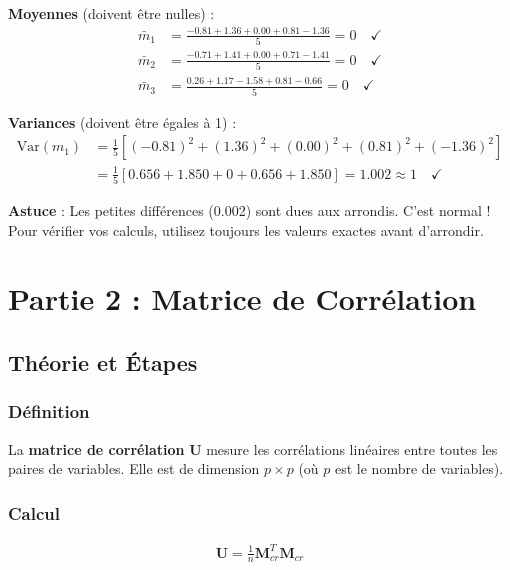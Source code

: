 \documentclass[11pt,a4paper]{article}
\newcommand{\Var}{\text{Var}}
\begin{document}
\textbf{Moyennes} (doivent être nulles) :
\begin{align*}
\bar{m}_1 &= \frac{-0.81 + 1.36 + 0.00 + 0.81 - 1.36}{5} = 0 \quad \checkmark \\
\bar{m}_2 &= \frac{-0.71 + 1.41 + 0.00 + 0.71 - 1.41}{5} = 0 \quad \checkmark \\
\bar{m}_3 &= \frac{0.26 + 1.17 - 1.58 + 0.81 - 0.66}{5} = 0 \quad \checkmark
\end{align*}

\textbf{Variances} (doivent être égales à 1) :
\begin{align*}
\Var(m_1) &= \frac{1}{5}[(-0.81)^2 + (1.36)^2 + (0.00)^2 + (0.81)^2 + (-1.36)^2] \\
&= \frac{1}{5}[0.656 + 1.850 + 0 + 0.656 + 1.850] = 1.002 \approx 1 \quad \checkmark
\end{align*}

\begin{astucebox}
\textbf{Astuce} : Les petites différences (0.002) sont dues aux arrondis. C'est normal ! Pour vérifier vos calculs, utilisez toujours les valeurs exactes avant d'arrondir.
\end{astucebox}

\newpage

\section{Partie 2 : Matrice de Corrélation}

\subsection{Théorie et Étapes}

\subsubsection{Définition}

La \textbf{matrice de corrélation} $\mathbf{U}$ mesure les corrélations linéaires entre toutes les paires de variables. Elle est de dimension $p \times p$ (où $p$ est le nombre de variables).

\subsubsection{Calcul}

\begin{align*}
\mathbf{U} = \frac{1}{n} \mathbf{M}_{cr}^T \mathbf{M}_{cr}
\end{align*}
\end{document}
